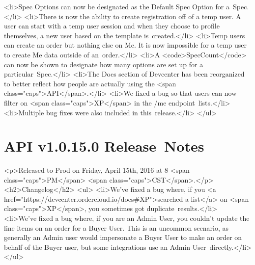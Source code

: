 \documentclass{memoir}%
\begin{document}
<li>Spec Options can now be designated as the Default Spec Option for a~Spec.</li>\newline%
<li>There is now the ability to create registration off of a temp user. A user can start with a temp user session and when they choose to profile themselves, a new user based on the template is~created.</li>\newline%
<li>Temp users can create an order but nothing else on Me. It is now impossible for a temp user to create Me data outside of an~order.</li>\newline%
<li>A <code>SpecCount</code> can now be shown to designate how many options are set up for a particular~Spec.</li>\newline%
<li>The Docs section of Devcenter has been reorganized to better reflect how people are actually using the <span class="caps">API</span>.</li>\newline%
<li>We fixed a bug so that users can now filter on <span class="caps">XP</span> in the /me endpoint~lists.</li>\newline%
<li>Multiple bug fixes were also included in this~release.</li>\newline%
</ul>

%
\section*{API v1.0.15.0 Release~Notes}%
\paragraph*{}%

%
\paragraph*{}%
<p>Released to Prod on Friday, April 15th, 2016 at 8 <span class="caps">PM</span> <span class="caps">CST</span>.</p>\newline%
<h2>Changelog</h2>\newline%
<ul>\newline%
<li>We’ve fixed a bug where, if you <a href="https://devcenter.ordercloud.io/docs\#XP">searched a list</a> on <span class="caps">XP</span>, you sometimes got duplicate~results.</li>\newline%
<li>We’ve fixed a bug where, if you are an Admin User, you couldn’t update the line items on an order for a Buyer User. This is an uncommon scenario, as generally an Admin user would impersonate a Buyer User to make an order on behalf of the Buyer user, but some integrations use an Admin User~directly.</li>\newline%
</ul>
\end{document}
